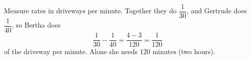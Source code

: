 Measure rates in driveways per minute. Together they do $\dfrac{1}{30}$, and Gertrude does $\dfrac{1}{40}$, so Bertha does
\[
\dfrac{1}{30}-\dfrac{1}{40}=\dfrac{4-3}{120}=\dfrac{1}{120}
\]
of the driveway per minute. Alone she needs $\boxed{120\text{ minutes}}$ (two hours).
